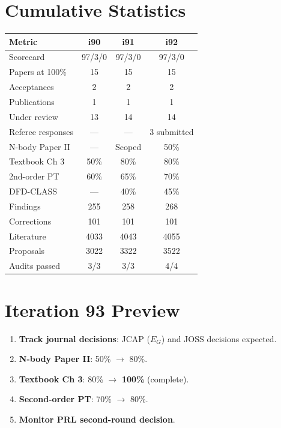 \documentclass[11pt,a4paper]{article}
\begin{document}
\section{Cumulative Statistics}

\begin{center}
\begin{tabular}{lccc}
\toprule
\textbf{Metric} & \textbf{i90} & \textbf{i91} & \textbf{i92} \\
\midrule
Scorecard & 97/3/0 & 97/3/0 & 97/3/0 \\
Papers at 100\% & 15 & 15 & 15 \\
Acceptances & 2 & 2 & 2 \\
Publications & 1 & 1 & 1 \\
Under review & 13 & 14 & 14 \\
Referee responses & --- & --- & 3 submitted \\
N-body Paper II & --- & Scoped & 50\% \\
Textbook Ch 3 & 50\% & 80\% & 80\% \\
2nd-order PT & 60\% & 65\% & 70\% \\
DFD-CLASS & --- & 40\% & 45\% \\
Findings & 255 & 258 & 268 \\
Corrections & 101 & 101 & 101 \\
Literature & 4033 & 4043 & 4055 \\
Proposals & 3022 & 3322 & 3522 \\
Audits passed & 3/3 & 3/3 & 4/4 \\
\bottomrule
\end{tabular}
\end{center}

\section{Iteration 93 Preview}

\begin{tcolorbox}[colback=blue!5!white, colframe=dfdblue, title=\textbf{i93 Targets}]
\begin{enumerate}[nosep]
\item \textbf{Track journal decisions}: JCAP ($E_G$) and JOSS decisions expected.
\item \textbf{N-body Paper II}: 50\% $\to$ 80\%.
\item \textbf{Textbook Ch 3}: 80\% $\to$ \textbf{100\%} (complete).
\item \textbf{Second-order PT}: 70\% $\to$ 80\%.
\item \textbf{Monitor PRL second-round decision}.
\end{enumerate}
\end{tcolorbox}
\end{document}
